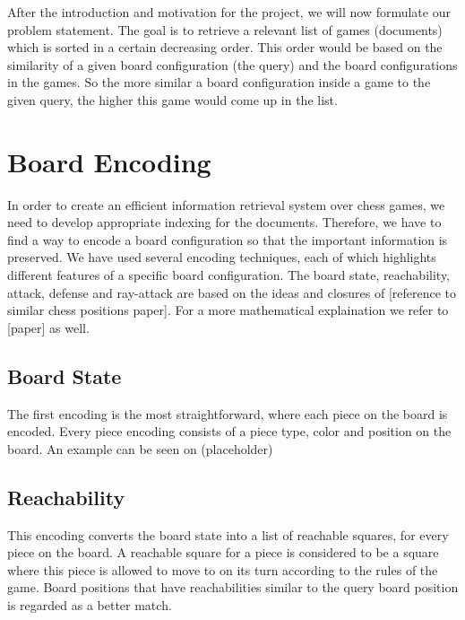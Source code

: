 \documentclass[11pt]{article}
\begin{document}
    After the introduction and motivation for the project, we will now formulate our problem statement. The goal is to retrieve a relevant list of games (documents) which is sorted in a certain decreasing order. This order would be based on the similarity of a given board configuration (the query) and the board configurations in the games. So the more similar a board configuration inside a game to the given query, the higher this game would come up in the list.



    \section{Board Encoding}

    In order to create an efficient information retrieval system over chess games, we need to develop appropriate indexing for the documents. Therefore, we have to find a way to encode a board configuration so that the important information is preserved. We have used several encoding techniques, each of which highlights different features of a specific board configuration. The board state, reachability, attack, defense and ray-attack are based on the ideas and closures of [reference to similar chess positions paper]. For a more mathematical explaination we refer to [paper] as well.

    \subsection{Board State}

    The first encoding is the most straightforward, where each piece on the board is encoded. Every piece encoding consists of a piece type, color and position on the board. An example can be seen on (placeholder)

    \subsection{Reachability}

    This encoding converts the board state into a list of reachable squares, for every piece on the board. A reachable square for a piece is considered to be a square where this piece is allowed to move to on its turn according to the rules of the game. Board positions that have reachabilities similar to the query board position is regarded as a better match.
\end{document}
